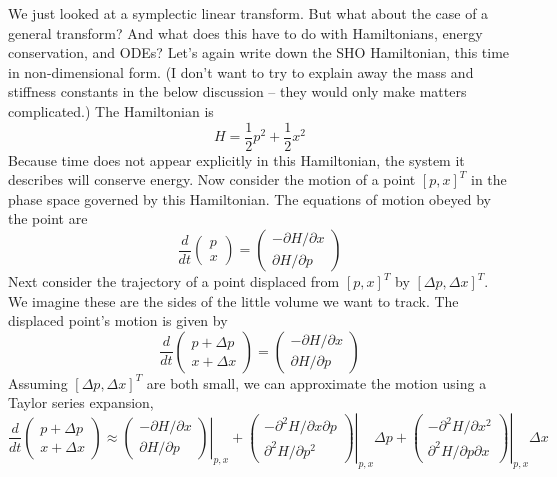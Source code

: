 \documentclass[hidelinks,notitlepage]{book}
\begin{document}
We just looked at a symplectic linear transform.  But what about the case of a general transform?  And what does this have to do with Hamiltonians, energy conservation, and ODEs?  Let's again write down the SHO Hamiltonian, this time in non-dimensional form.  (I don't want to try to explain away the mass and stiffness constants in the below discussion -- they would only make matters complicated.)  The Hamiltonian is
\begin{equation}
\label{eq:NonDimensionalSHOHamiltonian}
H = \frac{1}{2}p^2 + \frac{1}{2} x^2
\end{equation}
Because time does not appear explicitly in this Hamiltonian, the system it describes will conserve energy.  Now consider the motion of a point $[p, x]^T$ in the phase space governed by this Hamiltonian.  The equations of motion obeyed by the point are
\begin{equation}
\label{eq:FirstPoint}
\frac{d}{dt}
\begin{pmatrix}
p \\
x
\end{pmatrix}
 = 
\begin{pmatrix}
-\partial H / \partial x \\
\partial H / \partial p
\end{pmatrix}
\end{equation}
Next consider the trajectory of a point displaced from $[p, x]^T$ by $[\Delta p, \Delta x]^T$.  We imagine these are the sides of the little volume we want to track.  The displaced point's motion is given by
\begin{equation}
\nonumber
\frac{d}{dt}
\begin{pmatrix}
p + \Delta p \\
x + \Delta x
\end{pmatrix}
= 
\begin{pmatrix}
-\partial H / \partial x \\
\partial H / \partial p
\end{pmatrix}
\end{equation}
Assuming $[\Delta p, \Delta x]^T$ are both small, we can approximate the motion using a Taylor series expansion,
\begin{equation}
\label{eq:SecondPoint}
\frac{d}{dt}
\begin{pmatrix}
p + \Delta p \\
x + \Delta x
\end{pmatrix}
\approx
\left.
\begin{pmatrix}
-\partial H / \partial x \\
\partial H / \partial p
\end{pmatrix}
\right|_{p,x}
+
\left.
\begin{pmatrix}
-\partial^2 H / \partial x \partial p \\
\partial^2 H / \partial p^2
\end{pmatrix}
\right|_{p,x}
\Delta p
+
\left.
\begin{pmatrix}
-\partial^2 H / \partial x^2 \\
\partial^2 H / \partial p \partial x
\end{pmatrix}
\right|_{p,x}
\Delta x
\end{equation}
\end{document}
